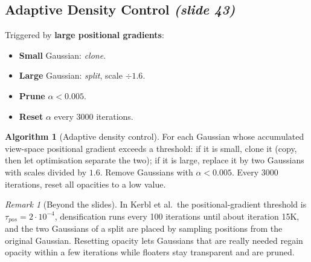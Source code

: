 \documentclass[11pt,a4paper]{article}
\newcommand{\sr}[1]{\texorpdfstring{\emph{(#1)}}{(#1)}}
\theoremstyle{definition}
\theoremstyle{algstyle}
\newtheorem{algorithm}[definition]{Algorithm}
\theoremstyle{plain}
\theoremstyle{remark}
\newtheorem{remark}[definition]{Remark}
\begin{document}
\subsection{Adaptive Density Control \sr{slide 43}}
Triggered by \textbf{large positional gradients}:
\begin{itemize}[nosep]
\item \textbf{Small} Gaussian: \emph{clone}.
\item \textbf{Large} Gaussian: \emph{split}, scale $\div1.6$.
\item \textbf{Prune} $\alpha<0.005$.
\item \textbf{Reset} $\alpha$ every 3000 iterations.
\end{itemize}

\begin{algorithm}[Adaptive density control]
For each Gaussian whose accumulated view-space positional gradient exceeds a threshold: if it is small, clone it (copy, then let optimisation separate the two); if it is large, replace it by two Gaussians with scales divided by $1.6$. Remove Gaussians with $\alpha<0.005$. Every 3000 iterations, reset all opacities to a low value.
\end{algorithm}

\begin{remark}[Beyond the slides]
In Kerbl et al.\ the positional-gradient threshold is $\tau_{pos}=2\cdot10^{-4}$, densification runs every 100 iterations until about iteration 15K, and the two Gaussians of a split are placed by sampling positions from the original Gaussian. Resetting opacity lets Gaussians that are really needed regain opacity within a few iterations while floaters stay transparent and are pruned.
\end{remark}
\end{document}
